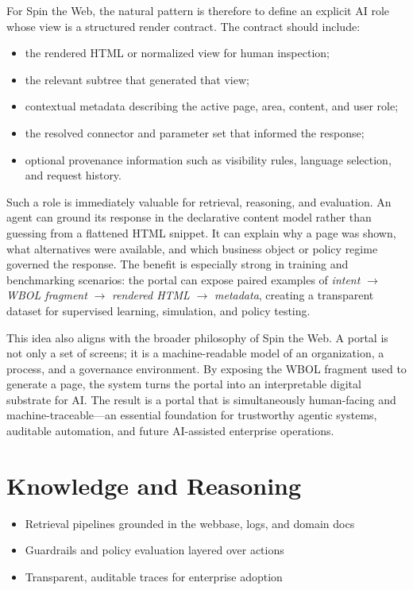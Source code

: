 For Spin the Web, the natural pattern is therefore to define an explicit AI role whose view is a structured render contract. The contract should include:
\begin{itemize}
	\item the rendered HTML or normalized view for human inspection;
	\item the relevant \wbol{} subtree that generated that view;
	\item contextual metadata describing the active page, area, content, and user role;
	\item the resolved connector and parameter set that informed the response;
	\item optional provenance information such as visibility rules, language selection, and request history.
\end{itemize}

Such a role is immediately valuable for retrieval, reasoning, and evaluation. An agent can ground its response in the declarative content model rather than guessing from a flattened HTML snippet. It can explain why a page was shown, what alternatives were available, and which business object or policy regime governed the response. The benefit is especially strong in training and benchmarking scenarios: the portal can expose paired examples of \emph{intent} $\rightarrow$ \emph{WBOL fragment} $\rightarrow$ \emph{rendered HTML} $\rightarrow$ \emph{metadata}, creating a transparent dataset for supervised learning, simulation, and policy testing.

This idea also aligns with the broader philosophy of Spin the Web. A portal is not only a set of screens; it is a machine-readable model of an organization, a process, and a governance environment. By exposing the WBOL fragment used to generate a page, the system turns the portal into an interpretable digital substrate for AI. The result is a portal that is simultaneously human-facing and machine-traceable—an essential foundation for trustworthy agentic systems, auditable automation, and future AI-assisted enterprise operations.

\section{Knowledge and Reasoning}
\begin{itemize}
	\item Retrieval pipelines grounded in the webbase, logs, and domain docs
	\item Guardrails and policy evaluation layered over actions
	\item Transparent, auditable traces for enterprise adoption
\end{itemize}

